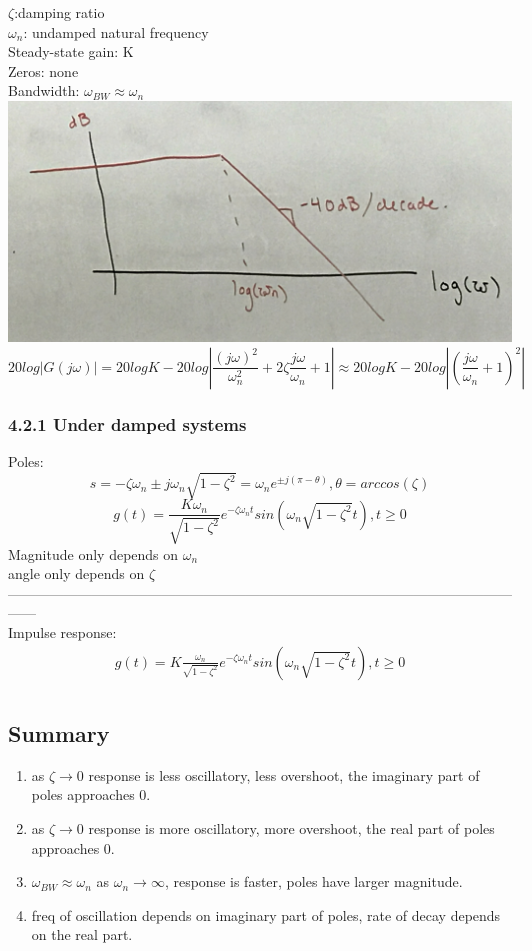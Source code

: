 \documentclass[letterpaper]{article}
\begin{document}
	$\zeta$:damping ratio\\
	$\omega_n$: undamped natural frequency\\
	Steady-state gain: K\\
	Zeros: none\\
	Bandwidth: $\omega_{BW}\approx \omega_n$\\
	\includegraphics[scale=0.1]{images/4_2BANDWIDTH.jpg}
	$$20log|G(j\omega)|=20logK-20log|\frac{(j\omega)^2}{\omega_n^2}+2\zeta\frac{j\omega}{\omega_n}+1|\approx 20logK-20log|(\frac{j\omega}{\omega_n}+1)^2|$$
	\subsubsection*{4.2.1 Under damped systems}
	Poles: $$s=-\zeta\omega_n\pm j\omega_n\sqrt{1-\zeta^2}=\omega_ne^{\pm j(\pi-\theta)}, \theta=arccos(\zeta)$$
	$$g(t)=\frac{K\omega_n}{\sqrt{1-\zeta^2}}e^{-\zeta\omega_n t}sin(\omega_n\sqrt{1-\zeta^2}t),t\geq 0$$
	Magnitude only depends on $\omega_n$\\
	angle only depends on $\zeta$\\
	------------------------------------------------------------------------------------------------------------------\\
	Impulse response:
	\begin{align*}
		g(t)=K\frac{\omega_n}{\sqrt{1-\zeta^2}}e^{-\zeta\omega_n t}sin(\omega_n\sqrt{1-\zeta^2}t),t\geq 0 \\
	\end{align*}
	\subsection*{Summary}
	\begin{enumerate}
		\item as $\zeta \rightarrow 0$ response is less oscillatory, less overshoot, the imaginary part of poles approaches 0.
		\item as $\zeta \rightarrow 0$ response is more oscillatory, more overshoot, the real part of poles approaches 0.
		\item $\omega_{BW}\approx \omega_n$ as $\omega_n\rightarrow \infty$, response is faster, poles have larger magnitude.
		\item freq of oscillation depends on imaginary part of poles, rate of decay depends on the real part.
	\end{enumerate}
\end{document}
